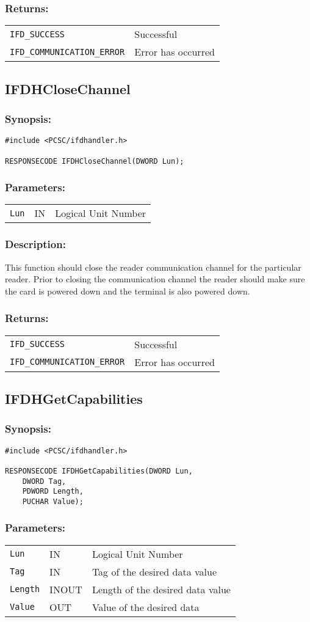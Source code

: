 \documentclass[a4paper,12pt]{article}
\newcommand{\synopsis}{\subsubsection{Synopsis:}}
\newcommand{\parameters}{\subsubsection{Parameters:}}
\newcommand{\desc}{\subsubsection{Description:}}
\newcommand{\returns}{\subsubsection{Returns:}}
\begin{document}
\returns

\begin{tabular}{ll}
\texttt{IFD\_SUCCESS} & Successful\\
\texttt{IFD\_COMMUNICATION\_ERROR} & Error has occurred
\end{tabular}


\subsection{IFDHCloseChannel}

\synopsis
\begin{verbatim}
#include <PCSC/ifdhandler.h>

RESPONSECODE IFDHCloseChannel(DWORD Lun);
\end{verbatim}

\parameters

\begin{tabular}{lll}
\texttt{Lun} & IN & Logical Unit Number \\
\end{tabular}

\desc

This function should close the reader communication channel for the
particular reader. Prior to closing the communication channel the reader
should make sure the card is powered down and the terminal is also
powered down.

\returns

\begin{tabular}{ll}
\texttt{IFD\_SUCCESS} & Successful\\
\texttt{IFD\_COMMUNICATION\_ERROR} & Error has occurred
\end{tabular}


\subsection{IFDHGetCapabilities}

\synopsis
\begin{verbatim}
#include <PCSC/ifdhandler.h>

RESPONSECODE IFDHGetCapabilities(DWORD Lun,
    DWORD Tag,
    PDWORD Length,
    PUCHAR Value);
\end{verbatim}

\parameters

\begin{tabular}{lll}
\texttt{Lun} & IN & Logical Unit Number \\
\texttt{Tag} & IN & Tag of the desired data value \\
\texttt{Length} & INOUT & Length of the desired data value \\
\texttt{Value} & OUT & Value of the desired data \\
\end{tabular}
\end{document}
